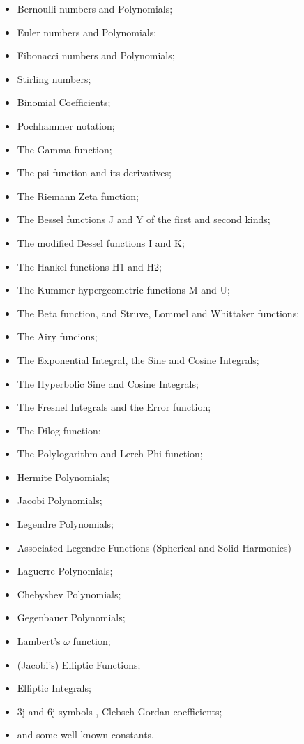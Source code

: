 \begin{itemize}
\item Bernoulli numbers and Polynomials;
\item Euler numbers and Polynomials;
\item Fibonacci numbers and Polynomials;
\item Stirling numbers;
\item Binomial Coefficients;
\item Pochhammer notation;
\item The Gamma function;
\item The psi function and its derivatives;
\item The Riemann Zeta function;
\item The Bessel functions J and Y of the first and second kinds;
\item The modified Bessel functions I and K;
\item The Hankel functions H1 and H2;
\item The Kummer hypergeometric functions M and U;
\item The Beta function, and Struve, Lommel and Whittaker functions;
\item The Airy funcions;
\item The Exponential Integral, the Sine and Cosine Integrals;
\item The Hyperbolic Sine and Cosine Integrals;
\item The Fresnel Integrals and the Error function;
\item The Dilog function;
\item The Polylogarithm and Lerch Phi function;
\item Hermite Polynomials;
\item Jacobi Polynomials;
\item Legendre Polynomials;
\item Associated Legendre Functions (Spherical and Solid Harmonics)
\item Laguerre Polynomials;
\item Chebyshev Polynomials;
\item Gegenbauer Polynomials;
\item Lambert's $\omega$ function;
\item (Jacobi's) Elliptic Functions;
\item Elliptic Integrals;
\item 3j and 6j symbols , Clebsch-Gordan coefficients;
\item and some well-known constants.
\end{itemize}

